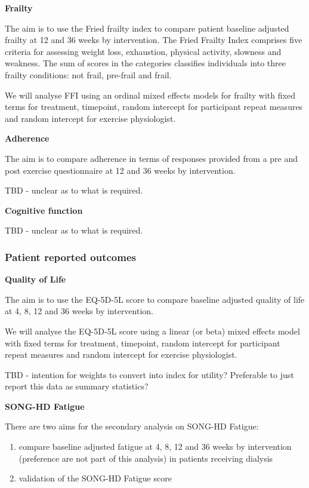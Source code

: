 \documentclass[
]{article}
\begin{document}
\textbf{Frailty}

The aim is to use the Fried frailty index to compare patient baseline adjusted frailty at 12 and 36 weeks by intervention.
The Fried Frailty Index comprises five criteria for assessing weight loss, exhaustion, physical activity, slowness and weakness.
The sum of scores in the categories classifies individuals into three frailty conditions: not frail, pre-frail and frail.

We will analyse FFI using an ordinal mixed effects models for frailty with fixed terms for treatment, timepoint, random intercept for participant repeat measures and random intercept for exercise physiologist.

\textbf{Adherence}

The aim is to compare adherence in terms of responses provided from a pre and post exercise questionnaire at 12 and 36 weeks by intervention.

TBD - unclear as to what is required.

\textbf{Cognitive function}

TBD - unclear as to what is required.



\hypertarget{patient-reported-outcomes}{%
  \subsubsection{Patient reported outcomes}\label{patient-reported-outcomes}}


\textbf{Quality of Life}

The aim is to use the EQ-5D-5L score to compare baseline adjusted quality of life at 4, 8, 12 and 36 weeks by intervention.

We will analyse the EQ-5D-5L score using a linear (or beta) mixed effects model with fixed terms for treatment, timepoint, random intercept for participant repeat measures and random intercept for exercise physiologist.

TBD - intention for weights to convert into index for utility? Preferable to just report this data as summary statistics?


\textbf{SONG-HD Fatigue}

There are two aims for the secondary analysis on SONG-HD Fatigue:

\begin{enumerate}
  \item compare baseline adjusted fatigue at 4, 8, 12 and 36 weeks by intervention (preference are not part of this analysis) in patients receiving dialysis
  \item validation of the SONG-HD Fatigue score
\end{enumerate}
\end{document}
